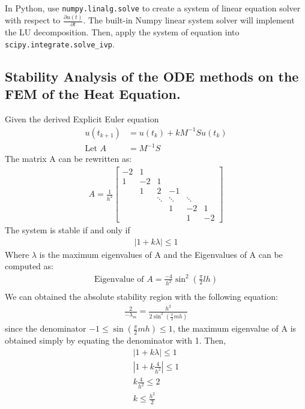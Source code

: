 \documentclass{article}
\begin{document}
In Python, use \texttt{numpy.linalg.solve} to create a system of linear equation solver with respect to $\frac{\partial u(t)}{\partial t}$. The built-in Numpy linear system solver will implement the LU decomposition. Then, apply the system of equation into \texttt{scipy.integrate.solve\_ivp}.


\subsection{Stability Analysis of the ODE methods on the FEM of the Heat Equation.}%
\label{sub:Stability Analysis of the ODE methods on the FEM of the Heat Equation.}
Given the derived Explicit Euler equation
\begin{align}
  u(t_{k+1}) &= u(t_k) + kM^{-1}S u(t_k) \\
  \text{Let } A &= M^{-1}S
\end{align}
The matrix A can be rewritten as:
\begin{align}
A = \frac{1}{h^2}\begin{bmatrix}
  -2 & 1 \\
  1 & -2 & 1 \\
   & 1 & 2 & -1 \\
   & & \ddots & \ddots & \ddots \\
   & & & 1 & -2 & 1 \\
   & & & & 1 & -2
\end{bmatrix}
\end{align}
The system is stable if and only if 
\begin{align}
|1 + k \lambda| \le 1
\end{align}
Where $\lambda$ is the maximum eigenvalues of A and the Eigenvalues of A can be computed as:
\begin{align}
  \text{Eigenvalue of }A = \frac{-4}{h^2}\sin^2( \frac{\pi}{2} l h) \\
\end{align}
We can obtained the absolute stability region with the following equation:
\begin{align}
\frac{2}{-\lambda_m} = \frac{h^2}{2 \sin^2 \left( \frac{\pi}{2} m h \right)}
\end{align}
since the denominator $-1 \le \sin( \frac{\pi}{2}m h) \le 1$, the maximum eigenvalue of A is obtained simply by equating the denominator with 1. Then,
\begin{align}
|1 + k\lambda| \le 1 \\
|1 + k \frac{4}{h^2}| \le 1 \\
k \frac{4}{h^2} \le 2 \\
k \le \frac{h^2}{2}
\end{align}
\end{document}

